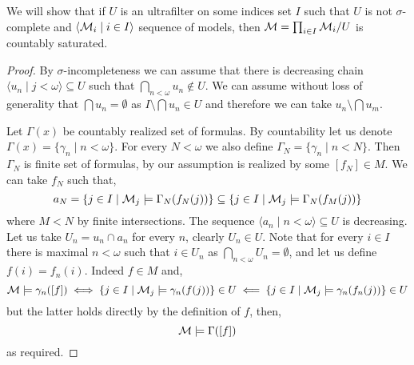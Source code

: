\subquestion{}
We will show that if $U$ is an ultrafilter on some indices set $I$ such that $U$ is not $\sigma$-complete and $\langle \mathcal{M}_i \mid i \in I \rangle$ sequence of models,
then $\mathcal{M} = \prod_{i \in I} \mathcal{M}_i / U$ is countably saturated.
\begin{proof}
	By $\sigma$-incompleteness we can assume that there is decreasing chain $\langle u_n \mid j < \omega \rangle \subseteq U$ such that $\bigcap_{n < \omega} u_n \notin U$.
	We can assume without loss of generality that $\bigcap u_n = \emptyset$ as $I \setminus \bigcap u_n \in U$ and therefore we can take $u_n \setminus \bigcap u_m$.

	Let $\Gamma(x)$ be countably realized set of formulas.
	By countability let us denote $\Gamma(x) = \{ \gamma_n \mid n < \omega \}$.
	For every $N < \omega$ we also define $\Gamma_N = \{ \gamma_n \mid n < N \}$.
	Then $\Gamma_N$ is finite set of formulas, by our assumption is realized by some $[f_N] \in M$.
	We can take $f_N$ such that,
	\[
		a_N
		= \{ j \in I \mid \mathcal{M}_j \models \Gamma_N(f_N(j)) \}
		\subseteq \{ j \in I \mid \mathcal{M}_j \models \Gamma_N(f_M(j)) \}
	\]
	where $M < N$ by finite intersections.
	The sequence $\langle a_n \mid n < \omega \rangle \subseteq U$ is decreasing.
	Let us take $U_n = u_n \cap a_n$ for every $n$, clearly $U_n \in U$.
	Note that for every $i \in I$ there is maximal $n < \omega$ such that $i \in U_n$ as $\bigcap_{n < \omega} U_n = \emptyset$, and let us define $f(i) = f_n(i)$.
	Indeed $f \in M$ and,
	\[
		\mathcal{M} \models \gamma_n([f])
		\iff \{ j \in I \mid \mathcal{M}_j \models \gamma_n(f(j)) \} \in U
		\impliedby \{ j \in I \mid \mathcal{M}_j \models \gamma_n(f_n(j)) \} \in U
	\]
	but the latter holds directly by the definition of $f$, then,
	\[
		\mathcal{M} \models \Gamma([f])
	\]
	as required.
\end{proof}


